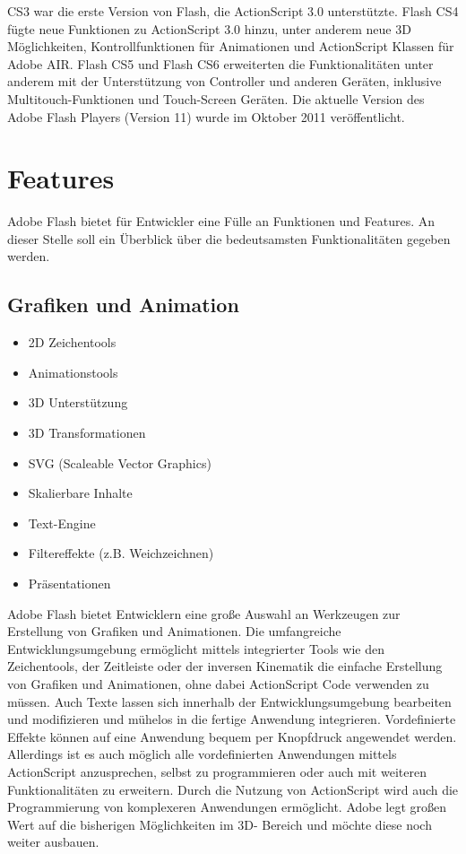 CS3 war die erste Version von Flash, die ActionScript 3.0 unterstützte. Flash
CS4 fügte neue Funktionen zu ActionScript 3.0 hinzu, unter anderem neue 3D
Möglichkeiten, Kontrollfunktionen für Animationen und ActionScript Klassen für
Adobe AIR. Flash CS5 und Flash CS6 erweiterten die Funktionalitäten unter
anderem mit der Unterstützung von Controller und anderen Geräten, inklusive
Multitouch-Funktionen und Touch-Screen Geräten.
\newline\newline
Die aktuelle Version des Adobe Flash Players (Version 11) wurde im
Oktober 2011 veröffentlicht.


\section{Features}
Adobe Flash bietet für Entwickler eine Fülle an Funktionen und Features.
An dieser Stelle soll ein Überblick über die bedeutsamsten Funktionalitäten
gegeben werden.

\subsection{Grafiken und Animation}
\begin{itemize}
	\item{2D Zeichentools}
	\item{Animationstools}
	\item{3D Unterstützung}
	\item{3D Transformationen}
	\item{SVG (Scaleable Vector Graphics)}
	\item{Skalierbare Inhalte}
	\item{Text-Engine}
	\item{Filtereffekte (z.B. Weichzeichnen)}
	\item{Präsentationen}
\end{itemize}
Adobe Flash bietet Entwicklern eine große Auswahl an Werkzeugen zur
Erstellung von Grafiken und Animationen. Die umfangreiche
Entwicklungsumgebung ermöglicht mittels integrierter Tools wie den
Zeichentools, der Zeitleiste oder der inversen Kinematik die einfache
Erstellung von Grafiken und Animationen, ohne dabei ActionScript Code verwenden
zu müssen. Auch Texte lassen sich innerhalb der Entwicklungsumgebung
bearbeiten und modifizieren und mühelos in die fertige Anwendung integrieren.
Vordefinierte Effekte können auf eine Anwendung bequem per Knopfdruck
angewendet werden. Allerdings ist es auch möglich alle vordefinierten
Anwendungen mittels ActionScript anzusprechen, selbst zu programmieren oder
auch mit weiteren Funktionalitäten zu erweitern. Durch die Nutzung von
ActionScript wird auch die Programmierung von komplexeren Anwendungen
ermöglicht. Adobe legt großen Wert auf die bisherigen Möglichkeiten im 3D-
Bereich und möchte diese noch weiter ausbauen.

